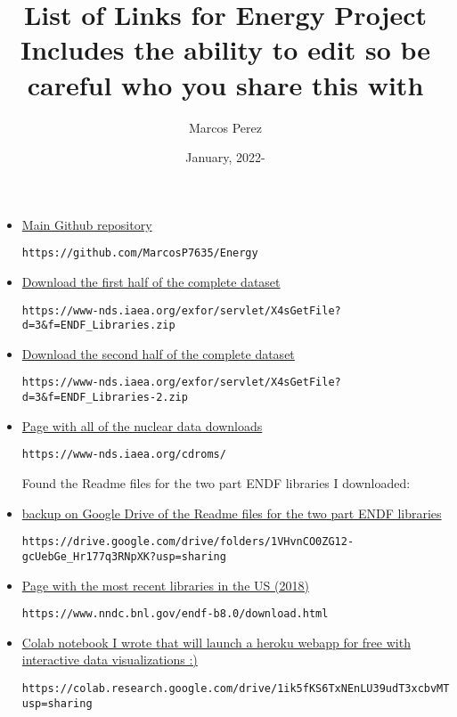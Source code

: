 \documentclass[12pt]{article}
\title{\vspace{-2cm}List of Links for Energy Project\\Includes the ability to edit so be careful who you share this with}
\author{Marcos Perez}
\date{January, 2022-}
\begin{document}
\maketitle
\begin{comment}
Copy paste and fill in the below template to add a new entry
\item \href{}{}
\begin{lstlisting}[breaklines]
\end{lstlisting}
\end{comment}
\begin{itemize}
\item \href{https://github.com/MarcosP7635/Energy}{Main Github repository}
\begin{lstlisting}[breaklines]
https://github.com/MarcosP7635/Energy
\end{lstlisting}
\item \href{https://www-nds.iaea.org/exfor/servlet/X4sGetFile?d=3&f=ENDF_Libraries.zip}{Download the first half of the complete dataset}
\begin{lstlisting}[breaklines]
https://www-nds.iaea.org/exfor/servlet/X4sGetFile?d=3&f=ENDF_Libraries.zip
\end{lstlisting}
\item \href{https://www-nds.iaea.org/exfor/servlet/X4sGetFile?d=3&f=ENDF_Libraries-2.zip}{Download the second half of the complete dataset}
\begin{lstlisting}[breaklines]
https://www-nds.iaea.org/exfor/servlet/X4sGetFile?d=3&f=ENDF_Libraries-2.zip
\end{lstlisting}
\item \href{https://www-nds.iaea.org/cdroms}{Page with all of the nuclear data downloads}
\begin{lstlisting}[breaklines]
https://www-nds.iaea.org/cdroms/
\end{lstlisting}

Found the Readme files for the two part ENDF libraries I downloaded: 

\item \href{https://drive.google.com/drive/folders/1VHvnCO0ZG12-gcUebGe_Hr177q3RNpXK?usp=sharing }{backup on Google Drive of the Readme files for the two part ENDF libraries}
\begin{lstlisting}[breaklines]
https://drive.google.com/drive/folders/1VHvnCO0ZG12-gcUebGe_Hr177q3RNpXK?usp=sharing
\end{lstlisting}
\item \href{https://www.nndc.bnl.gov/endf-b8.0/download.html}{Page with the most recent libraries in the US (2018)}
\begin{lstlisting}[breaklines]
https://www.nndc.bnl.gov/endf-b8.0/download.html
\end{lstlisting}
\item \href{https://colab.research.google.com/drive/1ik5fKS6TxNEnLU39udT3xcbvMTOguFfQ?usp=sharing }{Colab notebook I wrote that will launch a heroku webapp for free with interactive data visualizations :)}
\begin{lstlisting}[breaklines]
https://colab.research.google.com/drive/1ik5fKS6TxNEnLU39udT3xcbvMTOguFfQ?usp=sharing 
\end{lstlisting}


\end{itemize}
\end{document}
